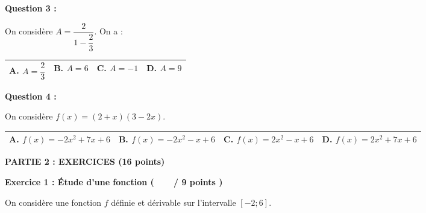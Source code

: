 \documentclass[12pt,a4paper]{exam}
\begin{document}
\vspace{10pt}

\textbf{Question 3 :}
\vspace{5pt}

On considère $A = \dfrac{2}{1 - \dfrac{2}{3}}$. On a :

\begin{center}
    \renewcommand{\arraystretch}{3}
    \begin{tabular}{|m{3.4cm}|m{3.4cm}|m{3.9cm}|m{3.4cm}|}
    \hline
    \centering \vspace{-0.3cm} \textbf{A.} $A = \dfrac{2}{3}$ & 
    \centering \vspace{-0.3cm} \textbf{B.} $A = 6$ & 
    \centering \vspace{-0.3cm} \textbf{C.} $A = -1$ & 
    \centering \vspace{-0.3cm} \textbf{D.} $A = 9$ \tabularnewline
    \hline
    \end{tabular}
\end{center}

\vspace{10pt}

\textbf{Question 4 :}
\vspace{5pt}

On considère $f(x) = (2 + x)(3 - 2x)$.

\begin{center}
    \renewcommand{\arraystretch}{3}
    \begin{tabular}{|m{3.4cm}|m{3.4cm}|m{3.9cm}|m{3.8cm}|}
    \hline
    \centering \vspace{-0.3cm} \textbf{A.} $f(x) = -2x^2 +7x + 6$& 
    \centering \vspace{-0.3cm} \textbf{B.} $f(x) = -2x^2 -x + 6$& 
    \centering \vspace{-0.3cm} \textbf{C.} $f(x) = 2x^2 -x + 6$& 
    \centering \vspace{-0.3cm} \textbf{D.} $f(x) = 2x^2 +7x + 6$ \tabularnewline
    \hline
    \end{tabular}
\end{center}

\vspace{10pt}


\noindent
\textbf{\large{PARTIE 2 : EXERCICES (16 points)}}

\vspace{10pt}
\noindent
\textbf{Exercice 1 : Étude d’une fonction (\ \ \ \  / 9 points )}

\vspace{5pt}
On considère une fonction $f$ définie et dérivable sur l’intervalle $\left[-2;6\right]$.
\end{document}
